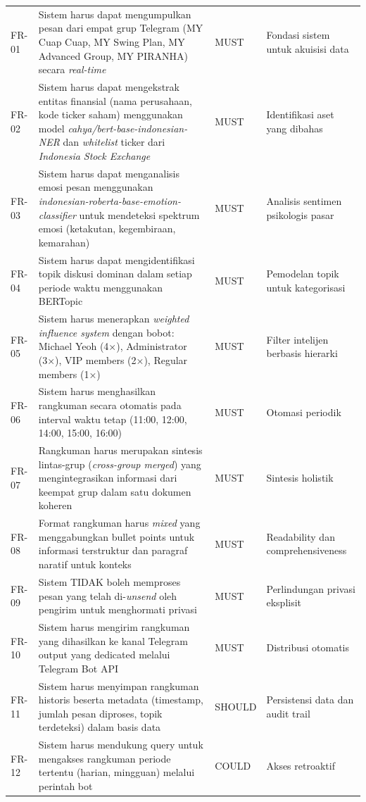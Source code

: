 \begin{longtable}{@{\extracolsep{\fill}} p{1.5cm} p{8cm} p{2cm} p{3cm}}
FR-01 & Sistem harus dapat mengumpulkan pesan dari empat grup Telegram (MY Cuap Cuap, MY Swing Plan, MY Advanced Group, MY PIRANHA) secara \textit{real-time} & MUST & Fondasi sistem untuk akuisisi data \\
FR-02 & Sistem harus dapat mengekstrak entitas finansial (nama perusahaan, kode ticker saham) menggunakan model \textit{cahya/bert-base-indonesian-NER} dan \textit{whitelist} ticker dari \textit{Indonesia Stock Exchange} & MUST & Identifikasi aset yang dibahas \\
FR-03 & Sistem harus dapat menganalisis emosi pesan menggunakan \textit{indonesian-roberta-base-emotion-classifier} untuk mendeteksi spektrum emosi (ketakutan, kegembiraan, kemarahan) & MUST & Analisis sentimen psikologis pasar \\
FR-04 & Sistem harus dapat mengidentifikasi topik diskusi dominan dalam setiap periode waktu menggunakan BERTopic & MUST & Pemodelan topik untuk kategorisasi \\
FR-05 & Sistem harus menerapkan \textit{weighted influence system} dengan bobot: Michael Yeoh (4×), Administrator (3×), VIP members (2×), Regular members (1×) & MUST & Filter intelijen berbasis hierarki \\
FR-06 & Sistem harus menghasilkan rangkuman secara otomatis pada interval waktu tetap (11:00, 12:00, 14:00, 15:00, 16:00) & MUST & Otomasi periodik \\
FR-07 & Rangkuman harus merupakan sintesis lintas-grup (\textit{cross-group merged}) yang mengintegrasikan informasi dari keempat grup dalam satu dokumen koheren & MUST & Sintesis holistik \\
FR-08 & Format rangkuman harus \textit{mixed} yang menggabungkan bullet points untuk informasi terstruktur dan paragraf naratif untuk konteks & MUST & Readability dan comprehensiveness \\
FR-09 & Sistem TIDAK boleh memproses pesan yang telah di-\textit{unsend} oleh pengirim untuk menghormati privasi & MUST & Perlindungan privasi eksplisit \\
FR-10 & Sistem harus mengirim rangkuman yang dihasilkan ke kanal Telegram output yang dedicated melalui Telegram Bot API & MUST & Distribusi otomatis \\
FR-11 & Sistem harus menyimpan rangkuman historis beserta metadata (timestamp, jumlah pesan diproses, topik terdeteksi) dalam basis data & SHOULD & Persistensi data dan audit trail \\
FR-12 & Sistem harus mendukung query untuk mengakses rangkuman periode tertentu (harian, mingguan) melalui perintah bot & COULD & Akses retroaktif \\
\end{longtable}

